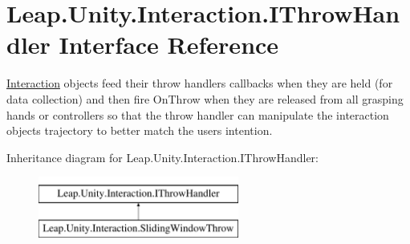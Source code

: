 \hypertarget{interface_leap_1_1_unity_1_1_interaction_1_1_i_throw_handler}{}\section{Leap.\+Unity.\+Interaction.\+I\+Throw\+Handler Interface Reference}
\label{interface_leap_1_1_unity_1_1_interaction_1_1_i_throw_handler}


\mbox{\hyperlink{namespace_leap_1_1_unity_1_1_interaction}{Interaction}} objects feed their throw handlers callbacks when they are held (for data collection) and then fire On\+Throw when they are released from all grasping hands or controllers so that the throw handler can manipulate the interaction object\textquotesingle{}s trajectory to better match the user\textquotesingle{}s intention.  


Inheritance diagram for Leap.\+Unity.\+Interaction.\+I\+Throw\+Handler\+:\begin{figure}[H]
\begin{center}
\leavevmode
\includegraphics[height=2.000000cm]{interface_leap_1_1_unity_1_1_interaction_1_1_i_throw_handler}
\end{center}
\end{figure}
